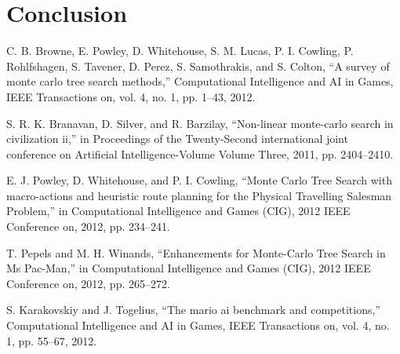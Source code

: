 \documentclass[10pt,a4paper]{article}
\begin{document}
\section{Conclusion}
\clearpage

\begin{thebibliography}{9}
  C. B. Browne, E. Powley, D. Whitehouse, S. M. Lucas, P. I. Cowling, P. Rohlfshagen, S. Tavener, D. Perez, S. Samothrakis, and S. Colton, “A survey of monte carlo tree search methods,” Computational Intelligence and AI in Games, IEEE Transactions on, vol. 4, no. 1, pp. 1–43, 2012.

S. R. K. Branavan, D. Silver, and R. Barzilay, “Non-linear monte-carlo search in civilization ii,” in Proceedings of the Twenty-Second international joint conference on Artificial Intelligence-Volume Volume Three, 2011, pp. 2404–2410.

E. J. Powley, D. Whitehouse, and P. I. Cowling, “Monte Carlo Tree Search with macro-actions and heuristic route planning for the Physical Travelling Salesman Problem,” in Computational Intelligence and Games (CIG), 2012 IEEE Conference on, 2012, pp. 234–241.

T. Pepels and M. H. Winands, “Enhancements for Monte-Carlo Tree Search in Ms Pac-Man,” in Computational Intelligence and Games (CIG), 2012 IEEE Conference on, 2012, pp. 265–272.

S. Karakovskiy and J. Togelius, “The mario ai benchmark and competitions,” Computational Intelligence and AI in Games, IEEE Transactions on, vol. 4, no. 1, pp. 55–67, 2012.
\end{thebibliography}
\end{document}
